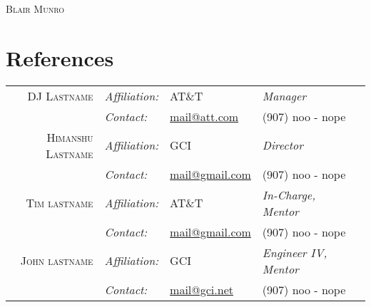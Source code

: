 \documentclass[letter,11pt]{article}
\begin{document}
\begin{center}


\vspace{100pt}
\huge \textsc{Blair Munro} \hspace{0cm}

\bigskip
\enlargethispage{\baselineskip}
\enlargethispage{\baselineskip}
\enlargethispage{\baselineskip}
\enlargethispage{\baselineskip}

\vspace{10pt}

\section{References}

\footnotesize{
\hspace{-28pt} %
\begin{tabular}{r|llp{5cm}l} %
\addlinespace[8pt]

		\textsc{DJ Lastname}
	&	\emph{Affiliation:} \hspace{0.5cm}
	&	AT\&T
	&	\emph{Manager}
	\\
		\rule{0pt}{12pt}
	&	\emph{Contact:}
	&	\href{mailto:mail@att.com}{mail@att.com}
	&	(907) noo - nope
	\\

\addlinespace[8pt]

		\textsc{Himanshu Lastname}
	&	\emph{Affiliation:}
	&	GCI
	&	\emph{Director}
	\\
		\rule{0pt}{12pt}
	&	\emph{Contact:}
	&	\href{mailto:mail@gmail.com}{mail@gmail.com}
	&	(907) noo - nope
	\\

\addlinespace[8pt]

		\textsc{Tim lastname}
	&	\emph{Affiliation:}
	&	AT\&T
	&	\emph{In-Charge, Mentor}
	\\
		\rule{0pt}{12pt}
	&	\emph{Contact:}
	&	\href{mailto:mail@gmail.com}{mail@gmail.com}
	&	(907) noo - nope
	\\

\addlinespace[8pt]

		\textsc{John lastname}
	&	\emph{Affiliation:}
	&	GCI
	&	\emph{Engineer IV, Mentor}
	\\
		\rule{0pt}{12pt}
	&	\emph{Contact:}
	&	\href{mailto:mail@gci.net}{mail@gci.net}
	&	(907) noo - nope
	\\


\end{tabular}}
\end{center}
\end{document}
